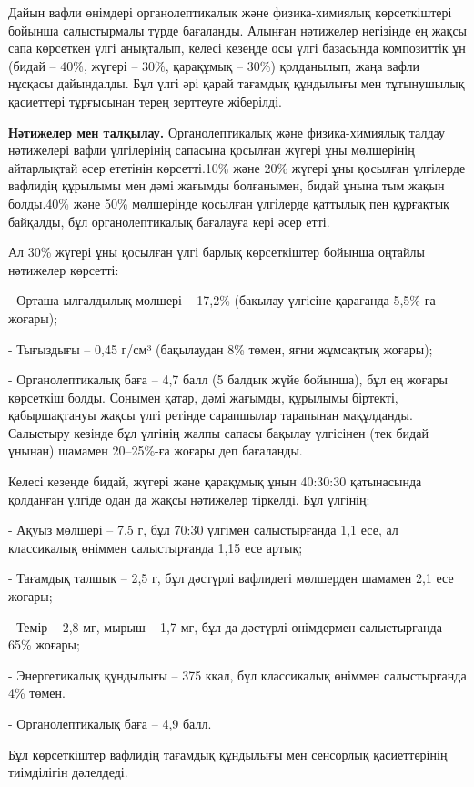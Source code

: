 \begin{multicols}{2}
Дайын вафли өнімдері органолептикалық және физика-химиялық көрсеткіштері
бойынша салыстырмалы түрде бағаланды. Алынған нәтижелер негізінде ең
жақсы сапа көрсеткен үлгі анықталып, келесі кезеңде осы үлгі базасында
композиттік ұн (бидай -- 40\%, жүгері -- 30\%, қарақұмық -- 30\%)
қолданылып, жаңа вафли нұсқасы дайындалды. Бұл үлгі әрі қарай тағамдық
құндылығы мен тұтынушылық қасиеттері тұрғысынан терең зерттеуге
жіберілді.

{\bfseries Нәтижелер мен талқылау.} Органолептикалық және физика-химиялық
талдау нәтижелері вафли үлгілерінің сапасына қосылған жүгері ұны
мөлшерінің айтарлықтай әсер ететінін көрсетті.10\% және 20\% жүгері ұны
қосылған үлгілерде вафлидің құрылымы мен дәмі жағымды болғанымен, бидай
ұнына тым жақын болды.40\% және 50\% мөлшерінде қосылған үлгілерде
қаттылық пен құрғақтық байқалды, бұл органолептикалық бағалауға кері
әсер етті.

Ал 30\% жүгері ұны қосылған үлгі барлық көрсеткіштер бойынша оңтайлы
нәтижелер көрсетті:

- Орташа ылғалдылық мөлшері -- 17,2\% (бақылау үлгісіне қарағанда
5,5\%-ға жоғары);

- Тығыздығы -- 0,45 г/см³ (бақылаудан 8\% төмен, яғни жұмсақтық жоғары);

- Органолептикалық баға -- 4,7 балл (5 балдық жүйе бойынша), бұл ең
жоғары көрсеткіш болды.
Сонымен қатар, дәмі жағымды, құрылымы біртекті, қабыршақтануы жақсы үлгі
ретінде сарапшылар тарапынан мақұлданды. Салыстыру кезінде бұл үлгінің
жалпы сапасы бақылау үлгісінен (тек бидай ұнынан) шамамен 20--25\%-ға
жоғары деп бағаланды.

Келесі кезеңде бидай, жүгері және қарақұмық ұнын 40:30:30 қатынасында
қолданған үлгіде одан да жақсы нәтижелер тіркелді. Бұл үлгінің:

- Ақуыз мөлшері -- 7,5 г, бұл 70:30 үлгімен салыстырғанда 1,1 есе, ал
классикалық өніммен салыстырғанда 1,15 есе артық;

- Тағамдық талшық -- 2,5 г, бұл дәстүрлі вафлидегі мөлшерден шамамен 2,1
есе жоғары;

- Темір -- 2,8 мг, мырыш -- 1,7 мг, бұл да дәстүрлі өнімдермен
салыстырғанда 65\% жоғары;

- Энергетикалық құндылығы -- 375 ккал, бұл классикалық өніммен
салыстырғанда 4\% төмен.

- Органолептикалық баға -- 4,9 балл.

Бұл көрсеткіштер вафлидің тағамдық құндылығы мен сенсорлық қасиеттерінің
тиімділігін дәлелдеді.
\end{multicols}

